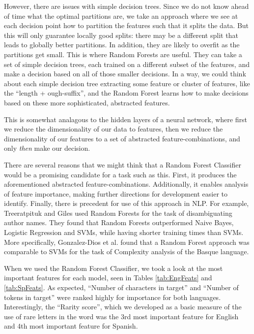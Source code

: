 \documentclass[11pt,a4paper]{article}
\begin{document}
However, there are issues with simple decision trees. Since we do not know ahead of time what the optimal partitions are, we take an approach where we see at each decision point how to partition the features such that it splits the data. But this will only guarantee locally good splits: there may be a different split that leads to globally better partitions. In addition, they are likely to overfit as the partitions get small. This is where Random Forests are useful. They can take a set of simple decision trees, each trained on a different subset of the features, and make a decision based on all of those smaller decisions. In a way, we could think about each simple decision tree extracting some feature or cluster of features, like the \enquote{length + ough-suffix}, and the Random Forest learns how to make decisions based on these more sophisticated, abstracted features. 

This is somewhat analagous to the hidden layers of a neural network, where first we reduce the dimensionality of our data to features, then we reduce the dimensionality of our features to a set of abstracted feature-combinations, and only \emph{then} make our decision.

 There are several reasons that we might think that a Random Forest Classifier would be a promising candidate for a task such as this. First, it produces the aforementioned abstracted feature-combinations. Additionally, it enables analysis of feature importance, making further directions for development easier to identify. Finally, there is precedent for use of this approach in NLP. For example, Treeratpituk and Giles \citep{treeratpituk2009disambiguating}
used Random Forests for the task of disambiguating author names. They found that Random Forests outperformed Naive Bayes, Logistic Regression and SVMs, while having shorter training times than SVMs. More specifically, Gonzalez-Dios et al. \cite{gonzalez2014simple} found that a Random Forest approach was comparable to SVMs for the task of Complexity analysis of the Basque language.



When we used the Random Forest Classifier, we took a look at the most important features for each model, seen in Tables \ref{tab:EngFeats} and \ref{tab:SpFeats}. As expected, \enquote{Number of characters in target} and \enquote{Number of tokens in target} were ranked highly for importance for both languages. Interestingly, the \enquote{Rarity score}, which we developed as a basic measure of the use of rare letters in the word was the 3rd most important feature for English and 4th most important feature for Spanish. 
\end{document}
